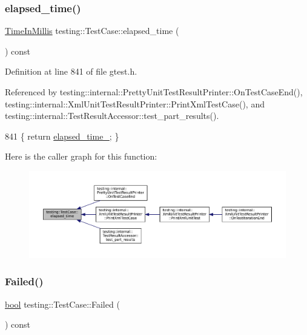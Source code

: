 \subsubsection{\texorpdfstring{elapsed\+\_\+time()}{elapsed\_time()}}
{\footnotesize\ttfamily \hyperlink{namespacetesting_a992de1d091ce660f451d1e8b3ce30fd6}{Time\+In\+Millis} testing\+::\+Test\+Case\+::elapsed\+\_\+time (\begin{DoxyParamCaption}{ }\end{DoxyParamCaption}) const\hspace{0.3cm}{\ttfamily [inline]}}



Definition at line 841 of file gtest.\+h.



Referenced by testing\+::internal\+::\+Pretty\+Unit\+Test\+Result\+Printer\+::\+On\+Test\+Case\+End(), testing\+::internal\+::\+Xml\+Unit\+Test\+Result\+Printer\+::\+Print\+Xml\+Test\+Case(), and testing\+::internal\+::\+Test\+Result\+Accessor\+::test\+\_\+part\+\_\+results().


\begin{DoxyCode}
841 \{ \textcolor{keywordflow}{return} \hyperlink{classtesting_1_1TestCase_a0379c376d8832e6fd1d5d9c7c3c32759}{elapsed\_time\_}; \}
\end{DoxyCode}
Here is the caller graph for this function\+:
\nopagebreak
\begin{figure}[H]
\begin{center}
\leavevmode
\includegraphics[width=350pt]{classtesting_1_1TestCase_acd7d6a77bce06da6ef90f5dad1c4def1_icgraph}
\end{center}
\end{figure}
\mbox{\label{classtesting_1_1TestCase_ae71c30eab6f1673b82090a0e745c2aa5}} 
\subsubsection{\texorpdfstring{Failed()}{Failed()}}
{\footnotesize\ttfamily \hyperlink{classbool}{bool} testing\+::\+Test\+Case\+::\+Failed (\begin{DoxyParamCaption}{ }\end{DoxyParamCaption}) const\hspace{0.3cm}{\ttfamily [inline]}}



